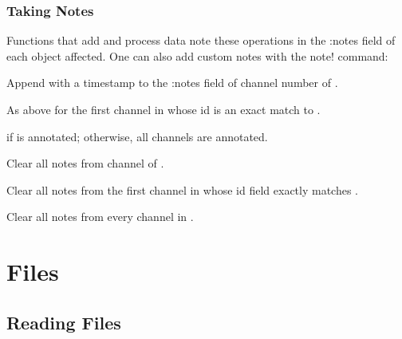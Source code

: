 \documentclass[letterpaper,11pt,english]{sphinxmanual}
\begin{document}
\subsection{Taking Notes}
\label{\detokenize{src/working_with_data:taking-notes}}
Functions that add and process data note these operations in the :notes field
of each object affected. One can also add custom notes with the note! command:


\begin{fulllineitems}
\end{fulllineitems}


Append  with a timestamp to the :notes field of channel number  of .


\begin{fulllineitems}
\end{fulllineitems}


As above for the first channel in  whose id is an exact match to .


\begin{fulllineitems}
\end{fulllineitems}


if  is annotated; otherwise, all channels are annotated.

Clear all notes from channel  of .


Clear all notes from the first channel in  whose id field exactly matches .


Clear all notes from every channel in .


\chapter{Files}
\label{\detokenize{index:files}}

\section{Reading Files}
\label{\detokenize{src/Formats/fileformats:reading-files}}\label{\detokenize{src/Formats/fileformats:readdata}}\label{\detokenize{src/Formats/fileformats::doc}}
\end{document}
